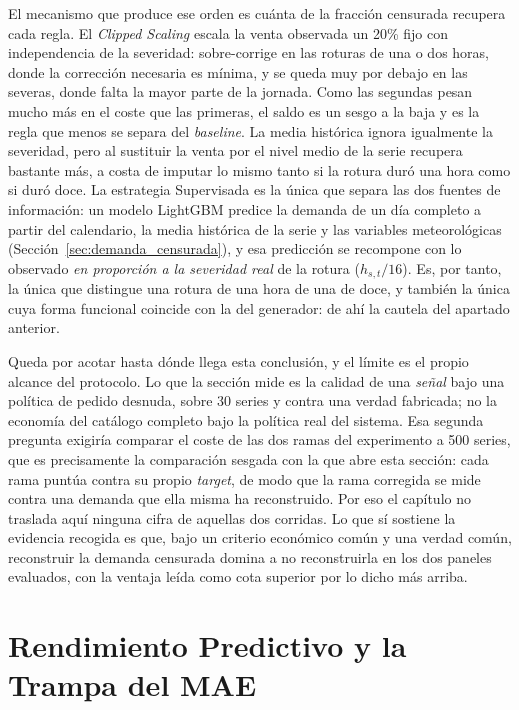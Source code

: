 El mecanismo que produce ese orden es cuánta de la fracción censurada recupera cada regla. El \textit{Clipped Scaling} escala la venta observada un 20\% fijo con independencia de la severidad: sobre-corrige en las roturas de una o dos horas, donde la corrección necesaria es mínima, y se queda muy por debajo en las severas, donde falta la mayor parte de la jornada. Como las segundas pesan mucho más en el coste que las primeras, el saldo es un sesgo a la baja y es la regla que menos se separa del \textit{baseline}. La media histórica ignora igualmente la severidad, pero al sustituir la venta por el nivel medio de la serie recupera bastante más, a costa de imputar lo mismo tanto si la rotura duró una hora como si duró doce. La estrategia Supervisada es la única que separa las dos fuentes de información: un modelo LightGBM predice la demanda de un día completo a partir del calendario, la media histórica de la serie y las variables meteorológicas (Sección~\ref{sec:demanda_censurada}), y esa predicción se recompone con lo observado \emph{en proporción a la severidad real} de la rotura ($h_{s,t}/16$). Es, por tanto, la única que distingue una rotura de una hora de una de doce, y también la única cuya forma funcional coincide con la del generador: de ahí la cautela del apartado anterior.

Queda por acotar hasta dónde llega esta conclusión, y el límite es el propio alcance del protocolo. Lo que la sección mide es la calidad de una \emph{señal} bajo una política de pedido desnuda, sobre 30 series y contra una verdad fabricada; no la economía del catálogo completo bajo la política real del sistema. Esa segunda pregunta exigiría comparar el coste de las dos ramas del experimento a 500 series, que es precisamente la comparación sesgada con la que abre esta sección: cada rama puntúa contra su propio \textit{target}, de modo que la rama corregida se mide contra una demanda que ella misma ha reconstruido. Por eso el capítulo no traslada aquí ninguna cifra de aquellas dos corridas. Lo que sí sostiene la evidencia recogida es que, bajo un criterio económico común y una verdad común, reconstruir la demanda censurada domina a no reconstruirla en los dos paneles evaluados, con la ventaja leída como cota superior por lo dicho más arriba.

\section{Rendimiento Predictivo y la Trampa del MAE}
\label{sec:predictivo_walkforward}

